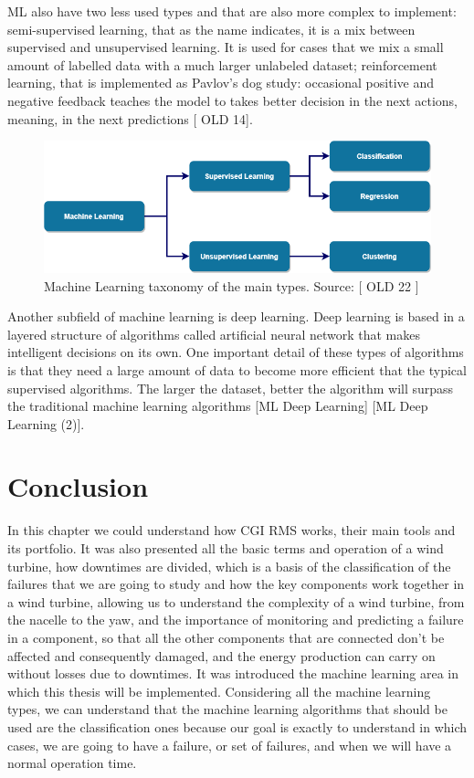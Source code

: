 ML also have two less used types and that are also more complex to implement: semi-supervised learning, that as the name indicates, it is a mix between supervised and unsupervised learning. It is used for cases that we mix a small amount of labelled data with a much larger unlabeled dataset; reinforcement learning, that is implemented as Pavlov’s dog study: occasional positive and negative feedback teaches the model to takes better decision in the next actions, meaning, in the next predictions [ OLD 14].

\begin{figure}[htbp]
	\centering
	\includegraphics[width=\textwidth]{Chapters/Figures/background_fig9.PNG}
	\caption{Machine Learning taxonomy of the main types. Source: [ OLD 22 ]}
	\label{fig:Figuras_Tree_silhouettes-vectorial}
\end{figure}

Another subfield of machine learning is deep learning. Deep learning is based in a layered structure of algorithms called artificial neural network that makes intelligent decisions on its own. One important detail of these types of algorithms is that they need a large amount of data to become more efficient that the typical supervised algorithms. The larger the dataset, better the algorithm will surpass the traditional machine learning algorithms [ML Deep Learning] [ML Deep Learning (2)].


\section{Conclusion} 
\label{sub:if_you_use_this_template} 

In this chapter we could understand how CGI RMS works, their main tools and its portfolio. It was also presented all the basic terms and operation of a wind turbine, how downtimes are divided, which is a basis of the classification of the failures that we are going to study and how the key components work together in a wind turbine, allowing us to understand the complexity of a wind turbine, from the nacelle to the yaw, and the importance of monitoring and predicting a failure in a component, so that all the other components that are connected don't be affected and consequently damaged, and the energy production can carry on without losses due to downtimes. It was introduced the machine learning area in which this thesis will be implemented. Considering all the machine learning types, we can understand that the machine learning algorithms that should be used are the classification ones because our goal is exactly to understand in which cases, we are going to have a failure, or set of failures, and when we will have a normal operation time.
